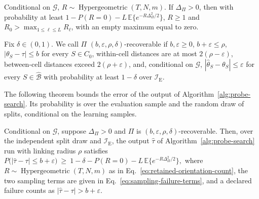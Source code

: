 \begin{lemma}
\label{lem:random-subsampling-plurality}
\normalfont
Conditional on $\mathcal G$, $R\sim\operatorname{Hypergeometric}(T,N,m)$. If $\Delta_\Pi>0$, then with probability at least $1-P(R=0)-L\,\mathbb E\{e^{-R\Delta_\Pi^2/2}\}$, $R\ge1$ and $R_0>\max_{1\le\ell\le L}R_\ell$, with an empty maximum equal to zero.
\end{lemma}

Fix $\delta\in(0,1)$. We call $\Pi$ $(b,\varepsilon,\rho,\delta)$-recoverable if $b,\varepsilon\ge0$, $b+\varepsilon\le\rho$, $|\theta_S-\tau|\le b$ for every $S\in C_0$, within-cell distances are at most $2(\rho-\varepsilon)$, between-cell distances exceed $2(\rho+\varepsilon)$, and, conditional on $\mathcal G$, $|\widehat\theta_S-\theta_S|\le\varepsilon$ for every $S\in\widehat{\mathcal B}$ with probability at least $1-\delta$ over $\mathcal I_{\mathrm E}$.

The following theorem bounds the error of the output of Algorithm~\ref{alg:probe-search}. Its probability is over the evaluation sample and the random draw of splits, conditional on the learning samples.

\begin{theorem}
\label{appdetail:thm:probe-search-error}
\normalfont
Conditional on $\mathcal G$, suppose $\Delta_\Pi>0$ and $\Pi$ is $(b,\varepsilon,\rho,\delta)$-recoverable. Then, over the independent split draw and $\mathcal I_{\mathrm E}$, the output $\widehat\tau$ of Algorithm~\ref{alg:probe-search} run with linking radius $\rho$ satisfies
\(P\bigl(|\widehat\tau-\tau|\le b+\varepsilon\bigr) \ \ge\ 1-\delta-P(R=0)-L\,\mathbb E\bigl\{e^{-R\Delta_\Pi^2/2}\bigr\},\)
where $R\sim\operatorname{Hypergeometric}(T,N,m)$ as in Eq.~\eqref{eq:retained-orientation-count}, the two sampling terms are given in Eq.~\eqref{eq:sampling-failure-terms}, and a declared failure counts as $|\widehat\tau-\tau|>b+\varepsilon$.

\end{theorem}

